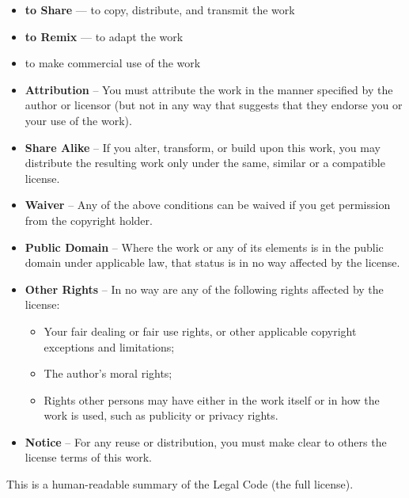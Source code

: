 \begin{frame}
  \begin{description}
  \tiny
  \item[You are free:] %
    \begin{itemize}
      \tiny
    \item \textbf{to Share} --- to copy, distribute, and transmit the work
    \item \textbf{to Remix} --- to adapt the work
    \item to make commercial use of the work
    \end{itemize}
  \item[Under the following conditions:] %
    \begin{itemize}
      \tiny
    \item \textbf{Attribution} -- You must attribute the work in the manner
      specified by the author or licensor (but not in any way that
      suggests that they endorse you or your use of the work).
    \item \textbf{Share Alike} -- If you alter, transform, or build upon this
      work, you may distribute the resulting work only under the same,
      similar or a compatible license.
    \end{itemize}
  \item[With the understanidng that:] 
    \begin{itemize}
      \tiny
    \item \textbf{Waiver} -- Any of the above conditions can be waived
      if you get permission from the copyright holder.
    \item \textbf{Public Domain} -- Where the work or any of its
      elements is in the public domain under applicable law, that
      status is in no way affected by the license.
    \item \textbf{Other Rights} -- In no way are any of the following
      rights affected by the license:
      \begin{itemize}
      \tiny
      \item Your fair dealing or fair use rights, or other
        applicable copyright exceptions and limitations;
      \item The author's moral rights;
      \item Rights other persons may have either in the work itself
        or in how the work is used, such as publicity or privacy
        rights.
      \end{itemize}
    \item \textbf{Notice} -- For any reuse or distribution, you must
      make clear to others the license terms of this work.
    \end{itemize}
  \end{description}

  This is a human-readable summary of the Legal Code (the full
  license).


\end{frame}


